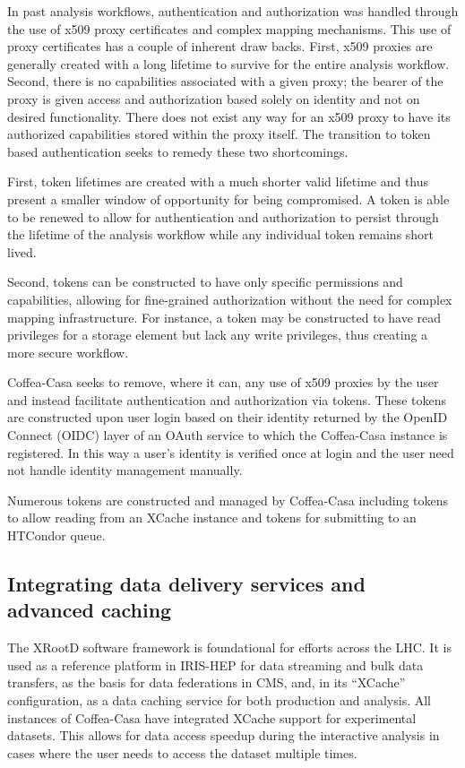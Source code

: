 \documentclass{webofc}
\begin{document}
In past analysis workflows, authentication and authorization was handled through the use of x509 proxy certificates and complex mapping mechanisms.  This use of proxy certificates has a couple of inherent draw backs.  First, x509 proxies are generally created with a long lifetime to survive for the entire analysis workflow.  Second, there is no capabilities associated with a given proxy; the bearer of the proxy is given access and authorization based solely on identity and not on desired functionality.   There does not exist any way for an x509 proxy to have its authorized capabilities stored within the proxy itself. The transition to token based authentication seeks to remedy these two shortcomings.

First, token lifetimes are created with a much shorter valid lifetime and thus present a smaller window of opportunity for being compromised.  A token is able to be renewed to allow for authentication and authorization to persist through the lifetime of the analysis workflow while any individual token remains short lived.

Second, tokens can be constructed to have only specific permissions and capabilities, allowing for fine-grained authorization without the need for complex mapping infrastructure.  For instance, a token may be constructed to have read privileges for a storage element but lack any write privileges, thus creating a more secure workflow.

Coffea-Casa seeks to remove, where it can, any use of x509 proxies by the user and instead facilitate authentication and authorization via tokens.  These tokens are constructed upon user login based on their identity returned by the OpenID Connect (OIDC) layer \cite{sakimura2014openid} of an OAuth service to which the Coffea-Casa instance is registered.  In this way a user's identity is verified once at login and the user need not handle identity management manually.

Numerous tokens are constructed and managed by Coffea-Casa including tokens to allow reading from an XCache \cite{bauerdick2014xrootd} instance and tokens for submitting to an HTCondor queue. 

\subsection{Integrating data delivery services and advanced caching}

The XRootD software framework is foundational for efforts across the LHC. It is used as a reference platform in IRIS-HEP \cite{iris-hep} for data streaming and bulk data transfers, as the basis for data federations in CMS, and, in its “XCache” configuration, as a data caching service for both production and analysis. All instances of Coffea-Casa have integrated XCache support  for experimental datasets.  This allows for data access speedup during the interactive analysis in cases where the user needs to access the dataset multiple times.
\end{document}
